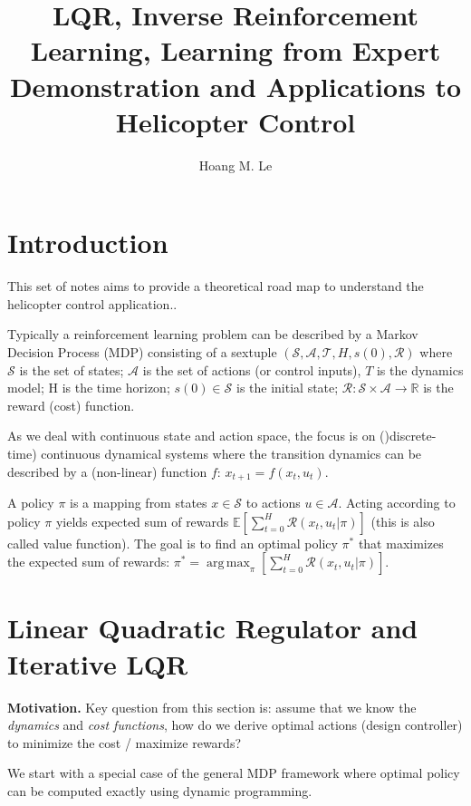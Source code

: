 \documentclass[a4paper]{article}
\title{LQR, Inverse Reinforcement Learning, Learning from Expert Demonstration and Applications to Helicopter Control}
\author{Hoang M. Le}
\DeclareMathOperator*{\argmax}{arg\,max}
\begin{document}
\maketitle


\section{Introduction}

This set of notes aims to provide a theoretical road map to understand the helicopter control application.\cite{abbeel2007application}. 

Typically a reinforcement learning problem can be described by a Markov Decision Process (MDP) consisting of a sextuple $\left(\mathcal{S}, \mathcal{A}, \mathcal{T},H, s(0), \mathcal{R}\right)$ where $\mathcal{S}$ is the set of states; $\mathcal{A}$ is the set of actions (or control inputs), $T$ is the dynamics model; H is the time horizon; $s(0)\in\mathcal{S}$ is the initial state; $\mathcal{R}:\mathcal{S}\times\mathcal{A}\rightarrow \mathbb{R}$ is the reward (cost) function.  


As we deal with continuous state and action space, the focus is on ()discrete-time) continuous dynamical systems where the transition dynamics can be described by a (non-linear) function $f$: $x_{t+1} = f(x_t,u_t)$. 

A policy $\pi$ is a mapping from states $x\in\mathcal{S}$ to actions $u\in\mathcal{A}$. Acting according to policy $\pi$ yields expected sum of rewards $\mathbb{E}\left[\sum_{t=0}^H \mathcal{R}(x_t,u_t | \pi)\right]$ (this is also called value function). The goal is to find an optimal policy $\pi^*$ that maximizes the expected sum of rewards: $\pi^* = \argmax_{\pi}\left[\sum_{t=0}^H \mathcal{R}(x_t,u_t | \pi)\right]$. 

\section{Linear Quadratic Regulator and Iterative LQR}
\label{lqr}
\textbf{Motivation.} Key question from this section is: assume that we know the \textit{dynamics} and \textit{cost functions}, how do we derive optimal actions (design controller) to minimize the cost / maximize rewards? 

We start with a special case of the general MDP framework where optimal policy can be computed exactly using dynamic programming. 
\end{document}
